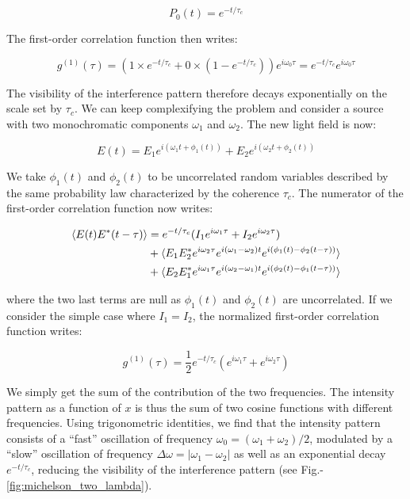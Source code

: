 \begin{equation}
    P_0(t)=e^{-t/\tau_c}
\end{equation}

\noindent The first-order correlation function then writes:


\begin{equation}
    g^{(1)} (\tau) = (1 \times e^{-t/\tau_c} + 0 \times (1-e^{-t/\tau_c})) e^{i \omega_0 \tau} = e^{-t/\tau_c}  e^{i \omega_0 \tau}
\end{equation}

The visibility of the interference pattern therefore decays exponentially on the scale set by $\tau_c$. We can keep complexifying the problem and consider a source with two monochromatic components $\omega_1$ and $\omega_2$. The new light field is now:

\begin{equation}
    E(t)= E_1 e^{i (\omega_1 t + \phi_1(t))} + E_2 e^{i (\omega_2 t+ \phi_2(t))} 
\end{equation}

\noindent We take $\phi_1(t)$ and $\phi_2(t)$ to be uncorrelated random variables described by the same probability law characterized by the coherence $\tau_c$. The numerator of the first-order correlation function now writes:

\begin{equation}
\begin{split}
       \langle E(t) E^*(t-\tau)\rangle  &= e^{-t/\tau_c}  (I_1 e^{i \omega_1 \tau} + I_2 e^{i \omega_2 \tau}) \\ 
       &+ \langle E_1 E_2^* e^{i \omega_2 \tau} e^{i (\omega_1 - \omega_2)t} e^{i(\phi_1(t)-\phi_2(t-\tau))}\rangle \\
       &+ \langle E_2 E_1^* e^{i \omega_1 \tau} e^{i (\omega_2 - \omega_1)t} e^{i(\phi_2(t)-\phi_1(t-\tau))}\rangle
\end{split}
\end{equation}

\noindent where the two last terms are null as $\phi_1(t)$ and $\phi_2(t)$ are uncorrelated. If we consider the simple case where $I_1=I_2$, the normalized first-order correlation function writes:

\begin{equation}
    g^{(1)} (\tau) = \frac{1}{2}  e^{-t/\tau_c} (e^{i \omega_1 \tau} + e^{i \omega_2 \tau})
\end{equation}

\noindent We simply get the sum of the contribution of the two frequencies. The intensity pattern as a function of $x$ is thus the sum of two cosine functions with different frequencies. Using trigonometric identities, we find that the intensity pattern consists of a ``fast'' oscillation of frequency $\omega_0=(\omega_1 + \omega_2)/2$, modulated by a ``slow'' oscillation of frequency $\Delta \omega = |\omega_1 - \omega_2|$ as well as an exponential decay $e^{-t/\tau_c}$, reducing the visibility of the interference pattern (see Fig.-\ref{fig:michelson_two_lambda}).

